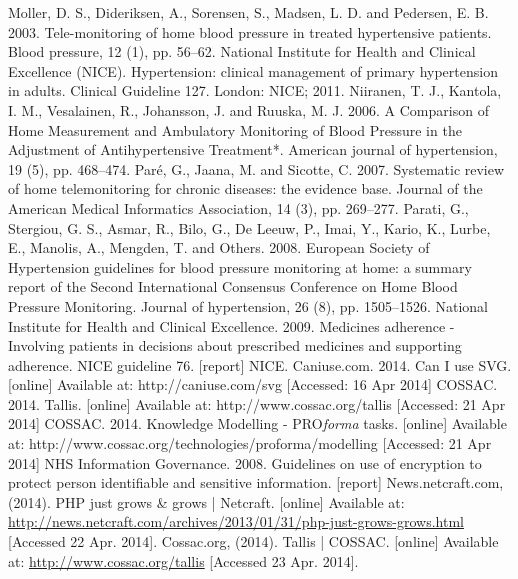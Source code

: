 \documentclass[11pt]{article}
\begin{document}
\begin{thebibliography}{40}
\begin{singlespace}
Moller, D. S., Dideriksen, A., Sorensen, S., Madsen, L. D. and Pedersen, E. B. 2003. Tele-monitoring of home blood pressure in treated hypertensive patients. Blood pressure, 12 (1), pp. 56--62.
National Institute for Health and Clinical Excellence (NICE). Hypertension: clinical management of primary hypertension in adults. Clinical Guideline 127. London: NICE; 2011.
Niiranen, T. J., Kantola, I. M., Vesalainen, R., Johansson, J. and Ruuska, M. J. 2006. A Comparison of Home Measurement and Ambulatory Monitoring of Blood Pressure in the Adjustment of Antihypertensive Treatment*. American journal of hypertension, 19 (5), pp. 468--474.
Par\'e, G., Jaana, M. and Sicotte, C. 2007. Systematic review of home telemonitoring for chronic diseases: the evidence base. Journal of the American Medical Informatics Association, 14 (3), pp. 269--277.
Parati, G., Stergiou, G. S., Asmar, R., Bilo, G., De Leeuw, P., Imai, Y., Kario, K., Lurbe, E., Manolis, A., Mengden, T. and Others. 2008. European Society of Hypertension guidelines for blood pressure monitoring at home: a summary report of the Second International Consensus Conference on Home Blood Pressure Monitoring. Journal of hypertension, 26 (8), pp. 1505--1526.
National Institute for Health and Clinical Excellence. 2009. Medicines adherence - Involving patients in decisions about prescribed medicines and supporting adherence. NICE guideline 76. [report] NICE.
Caniuse.com. 2014. Can I use SVG. [online] Available at: http://caniuse.com/svg [Accessed: 16 Apr 2014]
COSSAC. 2014. Tallis. [online] Available at: http://www.cossac.org/tallis [Accessed: 21 Apr 2014]
COSSAC. 2014. Knowledge Modelling - PRO\textit{forma} tasks. [online] Available at: http://www.cossac.org/technologies/proforma/modelling [Accessed: 21 Apr 2014]
NHS Information Governance. 2008. Guidelines on use of encryption to protect person identifiable and sensitive information. [report]
News.netcraft.com, (2014). PHP just grows \& grows | Netcraft. [online] Available at: \url{http://news.netcraft.com/archives/2013/01/31/php-just-grows-grows.html} [Accessed 22 Apr. 2014].
Cossac.org, (2014). Tallis | COSSAC. [online] Available at: \url{http://www.cossac.org/tallis} [Accessed 23 Apr. 2014].


\end{singlespace}
\end{thebibliography}
\end{document}
